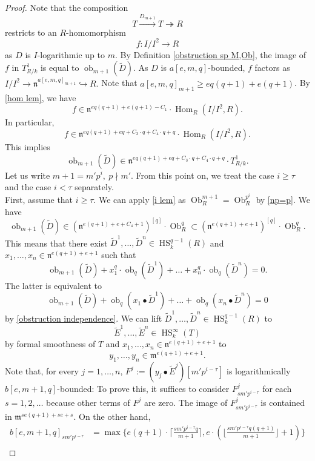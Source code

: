 \documentclass{amsart}
\newcommand{\Hom}{\operatorname{Hom}}
\newcommand{\HS}{\operatorname{HS}}
\begin{document}
\begin{proof}
    Note that the composition
    $$T\overset{D_{m+1}}{\longrightarrow} T\twoheadrightarrow R$$
    restricts to an $R$-homomorphism
    $$f: I/I^2\to R$$
    as $D$ is $I$-logarithmic up to $m$. By Definition \ref{obstruction sp M,Ob},  the image of $f$ in $T^1_{R/k}$ is equal to $\operatorname{ob}_{m+1}(\widetilde{D})$. As $D$ is $a[e,m,q]$-bounded, $f$ factors as $I/I^2\to \mathfrak{n}^{a[e,m,q]_{m+1}}\hookrightarrow R.$ Note that $ a[e,m,q]_{m+1} \ge eq(q+1)+e(q+1)$. 
     By \ref{hom lem}, we have $$f\in \mathfrak{n}^{eq(q+1)+e(q+1)-C_1}\cdot \Hom_R(I/I^2,R).$$ In particular, $$f\in \mathfrak{n}^{eq(q+1)+eq+C_3\cdot q+C_4\cdot q+q}\cdot \Hom_R(I/I^2,R).$$
    This implies
    $$\operatorname{ob}_{m+1}(\widetilde{D})\in \mathfrak{n}^{eq(q+1)+eq+C_3\cdot q+C_4\cdot q+q}\cdot T^1_{R/k}.$$
    Let us write $m+1=m'p^i,\ p\nmid m'$. From this point on, we treat the case $i\ge \tau$ and the case $i<\tau$ separately.\\
    First, assume that $i\ge \tau$. 
    We can apply \ref{i lem} as $\operatorname{Ob}_R^{m+1}=\operatorname{Ob}_R^{p^i}$ by \ref{np=p}. We have
    $$\operatorname{ob}_{m+1}(\widetilde{D})\in (\mathfrak{n}^{e(q+1)+e+C_4 +1})^{[q]}\cdot  \operatorname{Ob}_R^{q}\subset (\mathfrak{n}^{e(q+1)+e+1})^{[q]}\cdot  \operatorname{Ob}_R^{q}.$$
    This means that there exist $\widetilde{D}^1,\dots,\widetilde{D}^n\in \HS_k^{q-1}(R)$ and $x_1,\dots,x_n\in \mathfrak{n}^{e(q+1)+e+1}$ such that 
    $$\operatorname{ob}_{m+1}(\widetilde{D})+x_1^q\cdot\operatorname{ob}_q(\widetilde{D}^1)+\dots+x_n^q\cdot \operatorname{ob}_q(\widetilde{D}^n)=0.$$
    The latter is equivalent to
    $$\operatorname{ob}_{m+1}(\widetilde{D})+\operatorname{ob}_{q}(x_1\bullet\widetilde{D}^1)+\dots + \operatorname{ob}_{q}(x_n\bullet\widetilde{D}^n)=0$$
    by \ref{obstruction independence}. We can lift $\widetilde{D}^1,\dots,\widetilde{D}^n\in \HS_k^{q-1}(R)$ to $$\widetilde{E}^1,\dots,\widetilde{E}^n\in \HS_k^\infty(T)$$ by formal smoothness of $T$ and $x_1,\dots,x_n\in \mathfrak{n}^{e(q+1)+e+1}$ to $$y_1,\dots,y_n\in \mathfrak{m}^{e(q+1)+e+1}.$$
    Note that, for every $j=1,\dots,n$, $F^j:=(y_j\bullet \widetilde{E}^j)[m'p^{i-\tau}]$ is logarithmically $b[e,m+1,q]$-bounded: To prove this, it suffices to consider $F^j_{sm'p^{i-\tau}}$ for each $s=1,2,\dots$ because other terms of $F^j$ are zero. The image of $F^j_{sm'p^{i-\tau}}$ is contained in $\mathfrak{m}^{se(q+1)+se+s}$. On the other hand,
    \begin{align*}
   b[e,m+1,q]_{sm'p^{i-\tau}}& =\max\{e(q+1)\cdot \lceil \frac{sm'p^{i-\tau}q}{m+1} \rceil, e\cdot (\lfloor \frac{sm'p^{i-\tau}q(q+1)}{m+1} \rfloor+1)\}\\

\end{align*}
\end{proof}
\end{document}
